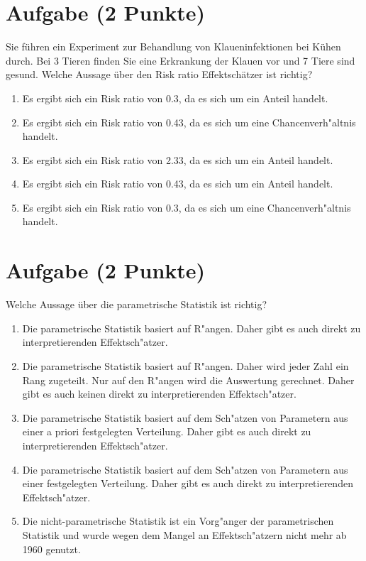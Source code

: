 \documentclass[a4paper, 10pt]{scrartcl}\usepackage[]{graphicx}\usepackage[]{xcolor}
\begin{document}
\section{Aufgabe \hfill (2 Punkte)}



Sie f{\"u}hren ein Experiment zur Behandlung von Klaueninfektionen bei K{\"u}hen
durch. Bei 3 Tieren finden Sie eine Erkrankung der Klauen vor und
7 Tiere sind gesund. Welche Aussage {\"u}ber den Risk ratio
Effektsch{\"a}tzer ist richtig?



\begin{enumerate}
\item [\textbf{A} \msquare] Es ergibt sich ein Risk ratio von 0.3, da es sich um ein Anteil handelt.
\item [\textbf{B} \msquare] Es ergibt sich ein Risk ratio von 0.43, da es sich um eine Chancenverh{"a}ltnis handelt.
\item [\textbf{C} \msquare] Es ergibt sich ein Risk ratio von 2.33, da es sich um ein Anteil handelt.
\item [\textbf{D} \msquare] Es ergibt sich ein Risk ratio von 0.43, da es sich um ein Anteil handelt.
\item [\textbf{E} \msquare] Es ergibt sich ein Risk ratio von 0.3, da es sich um eine Chancenverh{"a}ltnis handelt.
\end{enumerate}

\section{Aufgabe \hfill (2 Punkte)}




Welche Aussage {\"u}ber die parametrische Statistik ist richtig?



\begin{enumerate}
\item [\textbf{A} \msquare] Die parametrische Statistik basiert auf R{"a}ngen. Daher gibt es auch direkt zu interpretierenden Effektsch{"a}tzer.
\item [\textbf{B} \msquare] Die parametrische Statistik basiert auf R{"a}ngen. Daher wird jeder Zahl ein Rang zugeteilt. Nur auf den R{"a}ngen wird die Auswertung gerechnet. Daher gibt es auch keinen direkt zu interpretierenden Effektsch{"a}tzer.
\item [\textbf{C} \msquare] Die parametrische Statistik basiert auf dem Sch{"a}tzen von Parametern aus einer a priori festgelegten Verteilung. Daher gibt es auch direkt zu interpretierenden Effektsch{"a}tzer.
\item [\textbf{D} \msquare] Die parametrische Statistik basiert auf dem Sch{"a}tzen von Parametern aus einer festgelegten Verteilung. Daher gibt es auch direkt zu interpretierenden Effektsch{"a}tzer.
\item [\textbf{E} \msquare] Die nicht-parametrische Statistik ist ein Vorg{"a}nger der parametrischen Statistik und wurde wegen dem Mangel an Effektsch{"a}tzern nicht mehr ab 1960 genutzt.
\end{enumerate}
\end{document}
